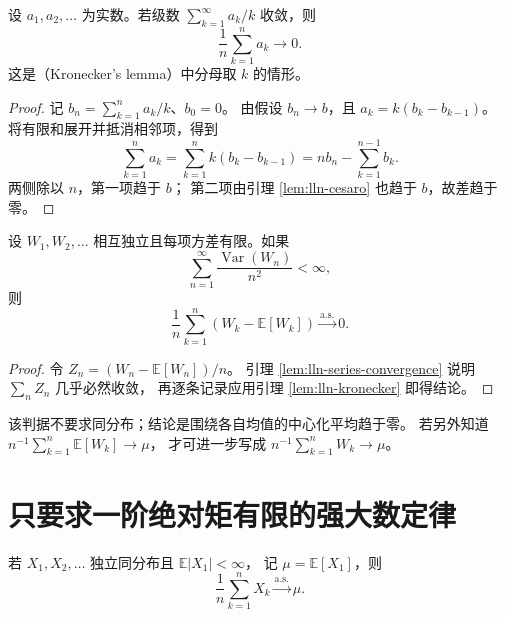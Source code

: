 \documentclass[UTF8]{ctexart}
\begin{document}
\begin{lemma}
\label{lem:lln-kronecker}
设 $a_1,a_2,\ldots$ 为实数。若级数
$\sum_{k=1}^\infty a_k/k$ 收敛，则
\[
  \frac1n\sum_{k=1}^n a_k\longrightarrow0.
\]
这是（Kronecker's lemma）中分母取 $k$ 的情形。
\end{lemma}

\begin{proof}
记 $b_n=\sum_{k=1}^n a_k/k$、$b_0=0$。
由假设 $b_n\to b$，且 $a_k=k(b_k-b_{k-1})$。
将有限和展开并抵消相邻项，得到
\[
  \sum_{k=1}^n a_k
  =\sum_{k=1}^n k(b_k-b_{k-1})
  =nb_n-\sum_{k=1}^{n-1}b_k.
\]
两侧除以 $n$，第一项趋于 $b$；
第二项由引理 \ref{lem:lln-cesaro} 也趋于 $b$，故差趋于零。
\end{proof}

\begin{corollary}[独立变量的方差级数判据]
\label{cor:lln-kolmogorov-criterion}
设 $W_1,W_2,\ldots$ 相互独立且每项方差有限。如果
\[
  \sum_{n=1}^\infty\frac{\operatorname{Var}(W_n)}{n^2}<\infty,
\]
则
\begin{equation}
  \frac1n\sum_{k=1}^n(W_k-\mathbb E[W_k])
  \xrightarrow{\mathrm{a.s.}}0.
  \label{eq:lln-variance-series-criterion}
\end{equation}
\end{corollary}

\begin{proof}
令 $Z_n=(W_n-\mathbb E[W_n])/n$。
引理 \ref{lem:lln-series-convergence} 说明 $\sum_nZ_n$ 几乎必然收敛，
再逐条记录应用引理 \ref{lem:lln-kronecker} 即得结论。
\end{proof}

该判据不要求同分布；结论是围绕各自均值的中心化平均趋于零。
若另外知道 $n^{-1}\sum_{k=1}^n\mathbb E[W_k]\to\mu$，
才可进一步写成 $n^{-1}\sum_{k=1}^nW_k\to\mu$。

\section{只要求一阶绝对矩有限的强大数定律}
\label{sec:lln-strong-integrable}

\begin{theorem}[可积独立同分布变量的强大数定律]
\label{thm:lln-slln-integrable}
若 $X_1,X_2,\ldots$ 独立同分布且 $\mathbb E|X_1|<\infty$，
记 $\mu=\mathbb E[X_1]$，则
\begin{equation}
  \frac1n\sum_{k=1}^nX_k\xrightarrow{\mathrm{a.s.}}\mu.
  \label{eq:lln-slln-integrable}
\end{equation}
\end{theorem}
\end{document}
